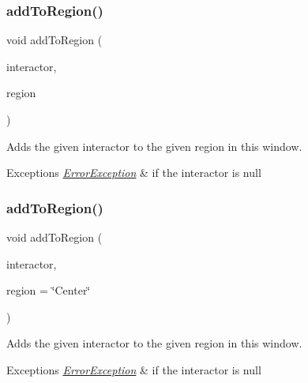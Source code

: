 \subsubsection{\texorpdfstring{add\+To\+Region()}{addToRegion()}\hspace{0.1cm}{\footnotesize\ttfamily [1/4]}}
{\footnotesize\ttfamily void add\+To\+Region (\begin{DoxyParamCaption}\item[{\mbox{\hyperlink{classGInteractor}{G\+Interactor}} $\ast$}]{interactor,  }\item[{\mbox{\hyperlink{classGWindow_a81a01a86de31071a92e6cce0bab9bc4b}{Region}}}]{region }\end{DoxyParamCaption})\hspace{0.3cm}{\ttfamily [virtual]}}



Adds the given interactor to the given region in this window. 


\begin{DoxyExceptions}{Exceptions}
{\em \mbox{\hyperlink{classErrorException}{Error\+Exception}}} & if the interactor is null \\
\hline
\end{DoxyExceptions}
\mbox{\label{classGWindow_a9c8e600889001e6e72d3548918a6baff}} 
\subsubsection{\texorpdfstring{add\+To\+Region()}{addToRegion()}\hspace{0.1cm}{\footnotesize\ttfamily [2/4]}}
{\footnotesize\ttfamily void add\+To\+Region (\begin{DoxyParamCaption}\item[{\mbox{\hyperlink{classGInteractor}{G\+Interactor}} $\ast$}]{interactor,  }\item[{const std\+::string \&}]{region = {\ttfamily \char`\"{}Center\char`\"{}} }\end{DoxyParamCaption})\hspace{0.3cm}{\ttfamily [virtual]}}



Adds the given interactor to the given region in this window. 


\begin{DoxyExceptions}{Exceptions}
{\em \mbox{\hyperlink{classErrorException}{Error\+Exception}}} & if the interactor is null \\
\hline
\end{DoxyExceptions}
\mbox{\label{classGWindow_ad05df0d92ab2fba95d401a5614365558}} 

